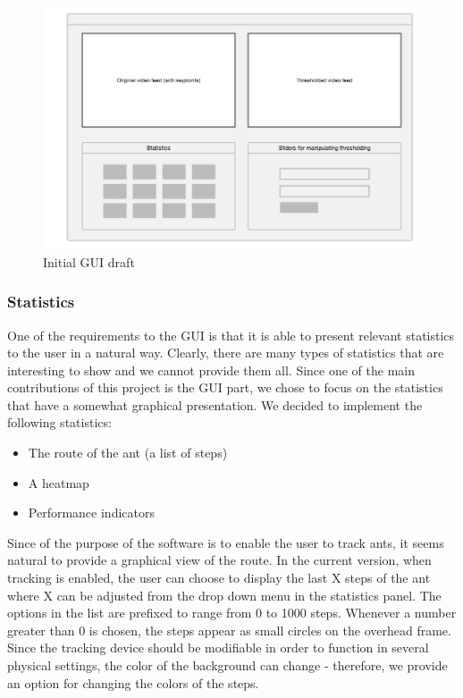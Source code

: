 \begin{figure}[!ht]
    \centering
    \includegraphics[scale = 0.3]{img/termes_gui.png}
    \caption{Initial GUI draft}
    \label{fig:gui}
\end{figure}

\subsubsection{Statistics} \mbox{}\par
One of the requirements to the GUI is that it is able to present relevant statistics to the user in a natural way. Clearly, there are many types of statistics that are interesting to show and we cannot provide them all. Since one of the main contributions of this project is the GUI part, we chose to focus on the statistics that have a somewhat graphical presentation. We decided to implement the following statistics:

\begin{itemize}
  \item{The route of the ant (a list of steps)}
  \item{A heatmap}
  \item{Performance indicators}
\end{itemize}

Since of the purpose of the software is to enable the user to track ants, it seems natural to provide a graphical view of the route. In the current version, when tracking is enabled, the user can choose to display the last X steps of the ant where X can be adjusted from the drop down menu in the statistics panel. The options in the list are prefixed to range from 0 to 1000 steps. Whenever a number greater than 0 is chosen, the steps appear as small circles on the overhead frame. Since the tracking device should be modifiable in order to function in several physical settings, the color of the background can change - therefore, we provide an option for changing the colors of the steps.

